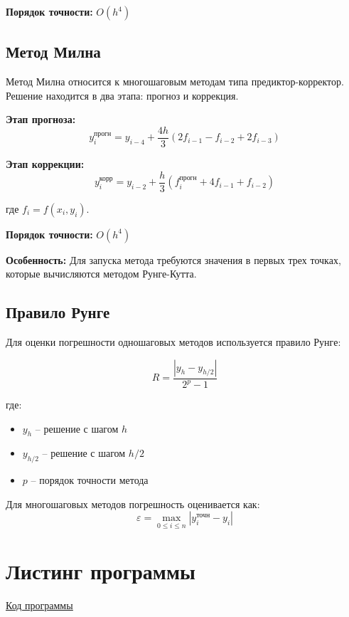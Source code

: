\documentclass[12pt,a4paper]{article}
\begin{document}
\textbf{Порядок точности:} $O(h^4)$

\subsection{Метод Милна}

Метод Милна относится к многошаговым методам типа предиктор-корректор. Решение находится в два этапа: прогноз и коррекция.

\textbf{Этап прогноза:}
\begin{equation}
    y_i^{\text{прогн}} = y_{i-4} + \frac{4h}{3}(2f_{i-1} - f_{i-2} + 2f_{i-3})
\end{equation}

\textbf{Этап коррекции:}
\begin{equation}
    y_i^{\text{корр}} = y_{i-2} + \frac{h}{3}(f_i^{\text{прогн}} + 4f_{i-1} + f_{i-2})
\end{equation}

где $f_i = f(x_i, y_i)$.

\textbf{Порядок точности:} $O(h^4)$

\textbf{Особенность:} Для запуска метода требуются значения в первых трех точках, которые вычисляются методом Рунге-Кутта.

\subsection{Правило Рунге}

Для оценки погрешности одношаговых методов используется правило Рунге:

\begin{equation}
    R = \frac{|y_h - y_{h/2}|}{2^p - 1}
\end{equation}

где:
\begin{itemize}
    \item $y_h$ -- решение с шагом $h$
    \item $y_{h/2}$ -- решение с шагом $h/2$
    \item $p$ -- порядок точности метода
\end{itemize}

Для многошаговых методов погрешность оценивается как:
\begin{equation}
    \varepsilon = \max_{0 \leq i \leq n} |y_i^{\text{точн}} - y_i|
\end{equation}

\section{Листинг программы}
{\href{https://github.com/sshubuntu/Itmo_labs/tree/main/4%20sem%20ComputationalMath/Lab6}{\underline{Код программы}}}
\newpage
\end{document}
